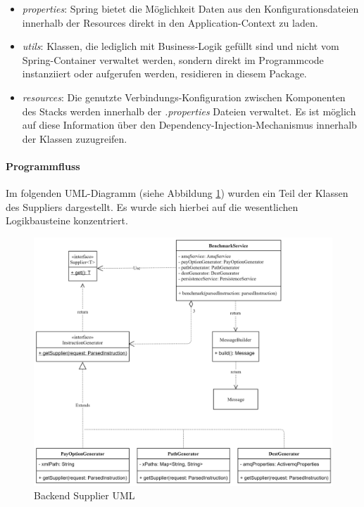 \begin{itemize}
  \item \emph{properties}: Spring bietet die Möglichkeit Daten aus den Konfigurationsdateien innerhalb der Resources direkt in den Application-Context zu laden.
  
  \item \emph{utils}: Klassen, die lediglich mit Business-Logik gefüllt sind und nicht vom Spring-Container verwaltet werden, sondern direkt im Programmcode instanziiert oder aufgerufen werden, residieren in diesem Package.
  
  \item \emph{resources}: Die genutzte Verbindungs-Konfiguration zwischen Komponenten des Stacks werden innerhalb der \emph{.properties} Dateien verwaltet. Es ist möglich auf diese Information über den Dependency-Injection-Mechanismus innerhalb der Klassen zuzugreifen.

\end{itemize}
\paragraph{Programmfluss}
Im folgenden UML-Diagramm (siehe Abbildung \ref{fig:supplierUml}) wurden ein Teil der Klassen des Suppliers dargestellt. Es wurde sich hierbei auf die wesentlichen Logikbausteine konzentriert. 

\begin{figure}[ht!]
	\centering
	\includegraphics[width=\linewidth]{kapitel/problemloesung/implementierung/_img/supplier-uml}
	\caption[Backend Supplier UML]{Backend Supplier UML}
	\label{fig:supplierUml}
\end{figure}

